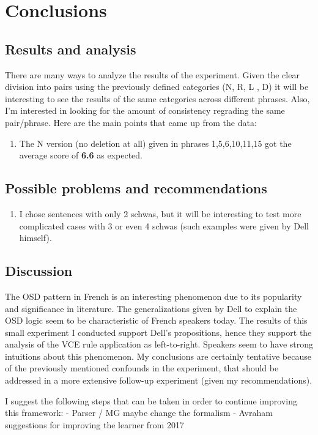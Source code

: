 \documentclass{article}
\begin{document}
\section{Conclusions}

\subsection{Results and analysis}
There are many ways to analyze the results of the experiment. Given the clear division into pairs using the previously defined categories (N, R, L , D) it will be interesting to see the results of the same categories across different phrases.  Also,  I'm interested in looking for the amount of consistency regrading the same pair/phrase.  Here are the main points that came up from the data:
\begin{enumerate}
  \item The N version (no deletion at all) given in phrases 1,5,6,10,11,15 got the average score of \textbf{6.6} as expected.
\end{enumerate}

\subsection{Possible problems and recommendations}
\begin{enumerate}
  \item I chose sentences with only 2 schwas, but it will be interesting to test more complicated cases with 3 or even 4 schwas (such examples were given by Dell himself).
\end{enumerate}

\subsection{Discussion}
The OSD pattern in French is an interesting phenomenon due to its popularity and significance in literature. The generalizations given by Dell to explain the OSD logic seem to be characteristic of French speakers today. The results of this small experiment I conducted support Dell's propositions, hence they support the analysis of the VCE rule application as left-to-right. Speakers seem to have strong intuitions about this phenomenon.
My conclusions are certainly tentative because of the previously mentioned confounds in the experiment,  that should be addressed in a more extensive follow-up experiment (given my recommendations).

I suggest the following steps that can be taken in order to continue improving this framework:
- Parser / MG maybe change the formalism
- Avraham suggestions for improving the learner from 2017 %
\end{document}
